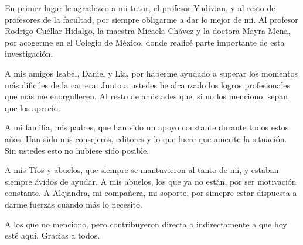 \begin{acknowledgements}
    En primer lugar le agradezco a mi tutor, el profesor Yudivian, y al resto de profesores de la facultad, por siempre obligarme a dar lo mejor de mi. Al profesor Rodrigo Cuéllar Hidalgo, la maestra Micaela Chávez y la doctora Mayra Mena, por acogerme en el Colegio de México, donde realicé parte importante de esta investigación.
    
    A mis amigos Isabel, Daniel y Lia, por haberme ayudado a superar los momentos más dificiles de la carrera. Junto a ustedes he alcanzado los logros profesionales que más me enorgullecen. Al resto de amistades que, si no los menciono, sepan que los aprecio.

    A mi familia, mis padres, que han sido un apoyo constante durante todos estos años. Han sido mis consejeros, editores y lo que fuere que amerite la situación. Sin ustedes esto no hubiese sido posible.
    
    A mis Tíos y abuelos, que siempre se mantuvieron al tanto de mi, y estaban siempre ávidos de ayudar. A mis abuelos, los que ya no están, por ser motivación constante. A Alejandra, mi compañera, mi soporte, por simepre estar dispuesta a darme fuerzas cuando más lo necesito.

    A los que no menciono, pero contribuyeron directa o indirectamente a que hoy esté aquí. Gracias a todos.
\end{acknowledgements}